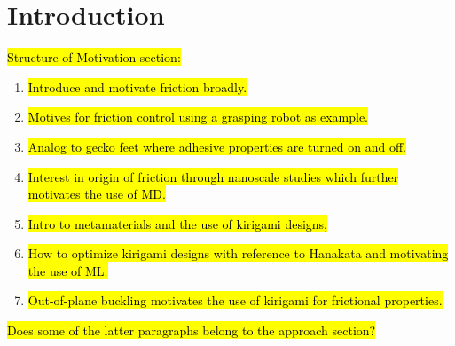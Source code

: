 \chapter{Introduction}

\hl{Structure of Motivation section:}
\begin{enumerate}
    \item \hl{Introduce and motivate friction broadly.}
    \item \hl{Motives for friction control using a grasping robot as example.}
    \item \hl{Analog to gecko feet where adhesive properties are turned on and off.}
    \item \hl{Interest in origin of friction through nanoscale studies which further motivates the use of MD.}
    \item \hl{Intro to metamaterials and the use of kirigami designs,}
    \item \hl{How to optimize kirigami designs with reference to Hanakata and motivating the use of ML.}
    \item \hl{Out-of-plane buckling motivates the use of kirigami for frictional properties.}
\end{enumerate}
\hl{Does some of the latter paragraphs belong to the approach section?}

